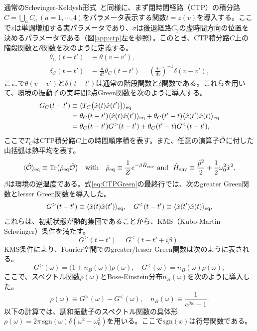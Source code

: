 \medskip
通常のSchwinger-Keldysh形式~\cite{Kamenev:2009jj,Bellac:2011kqa}と同様に、まず閉時間経路（CTP）の積分路$C = \bigcup_a C_{a}~ (a=1,\cdots,4)$をパラメータ表示する関数$t = z(v)$を導入する。ここで$v$は単調増加する実パラメータであり、$\sigma$は後退経路$C_2$の虚時間方向の位置を決めるパラメータである（図\ref{app:ctp}左を参照）。このとき、CTP積分路$C$上の階段関数と$\delta$関数を次のように定義する。
\begin{align}
 \theta_{C}(t-t') &\equiv \theta( v-v' ), \\
 \delta_{C} (t-t')
 &\equiv \frac{d}{dt}\theta_{C}(t -t')
 = \left( \frac{dz}{dv} \right)^{-1} \delta(v-v'),
\end{align}
ここで$\theta(v-v')$と$\delta(t-t')$は通常の階段関数と$\delta$関数である。これらを用いて、環境の振動子の実時間2点Green関数を次のように導入する。
\begin{equation}
 \begin{split}
  G_C (t- t')
  &\equiv
  \langle T_C \big( \hat{x} (t) \hat{x} (t') \big)\rangle_{\mathrm{eq}} \\
  &= \theta_C (t-t') \langle\hat{x} (t) \hat{x} (t')\rangle_{\mathrm{eq}}
  + \theta_C (t'-t) \langle\hat{x} (t') \hat{x} (t)\rangle_{\mathrm{eq}} \\
  &= \theta_C (t-t') G^> (t- t')
  + \theta_C (t'-t) G^< (t- t'),
 \end{split}
 \label{eq:CTPGreen}
\end{equation}
ここで$T_C$はCTP積分路$C$上の時間順序積を表す。また、任意の演算子${\hat{\mathcal{O}}}$に付した山括弧は熱平均を表す。
\begin{equation}
 \langle{\hat{\mathcal{O}}}\rangle_{\mathrm{eq}} \equiv
  \mathrm{Tr} \big(\hat{\rho}_{\mathrm{eq}} {\hat{\mathcal{O}}} \big)
  {\quad\mathrm{with}}\quad
  \hat{\rho}_{\mathrm{eq}}
  \equiv \frac{1}{Z} e^{-\beta \hat{H}_{\mathrm{env}}}
  ~\mathrm{and}~~
 \hat{H}_{\mathrm{env}} \equiv
  \frac{\hat{p}^2}{2} + \frac{1}{2} \omega_0^2 \hat{x}^2 ,
\end{equation}
$\beta$は環境の逆温度である。式\eqref{eq:CTPGreen}の最終行では、次のgreater Green関数とlesser Green関数を導入した。
\begin{equation}
  G^> (t- t') \equiv \langle\hat{x} (t) \hat{x} (t')\rangle_{\mathrm{eq}}, \quad
   G^<(t- t') \equiv  \langle\hat{x} (t') \hat{x} (t)\rangle_{\mathrm{eq}} ,
\end{equation}
これらは、初期状態が熱的集団であることから、KMS（Kubo-Martin-Schwinger）条件を満たす。
\begin{equation}
 G^> (t- t') = G^< (t- t'+i\beta).
\end{equation}
KMS条件により、Fourier空間でのgreater/lesser Green関数は次のように表される。
\begin{equation}
 G^> (\omega) = \big( 1 + n_B (\omega) \big) \rho (\omega), \quad
  G^< (\omega) = n_B (\omega) \rho (\omega),
\end{equation}
ここで、スペクトル関数$\rho(\omega)$とBose-Einstein分布$n_B(\omega)$を次のように導入した。
\begin{equation}
 \rho (\omega) \equiv G^>(\omega) - G^< (\omega),
  \quad
  n_B (\omega) \equiv \frac{1}{e^{\beta \omega} - 1}.
\end{equation}
以下の計算では、調和振動子のスペクトル関数の具体形$\rho(\omega)=2\pi\,\mathrm{sgn}(\omega)\delta(\omega^2-\omega_0^2)$を用いる。ここで$\mathrm{sgn}(x)$は符号関数である。

